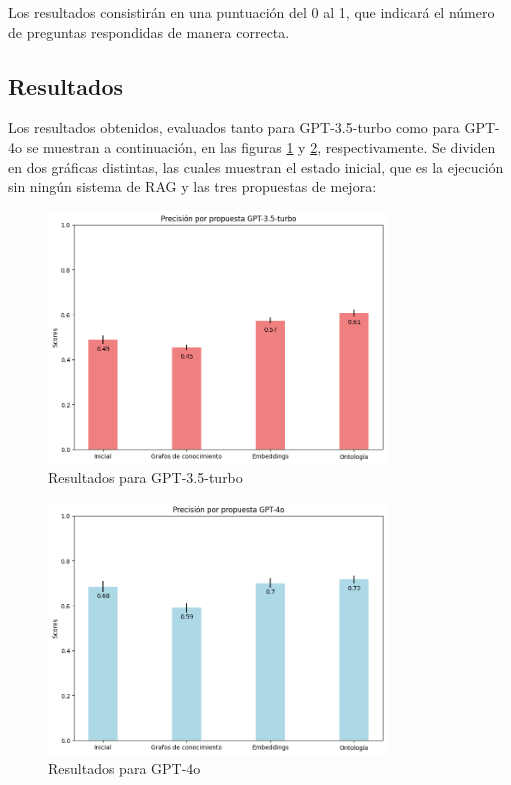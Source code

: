 Los resultados consistirán en una puntuación del 0 al 1, que indicará el número de preguntas respondidas de manera correcta.

\subsection{Resultados}
Los resultados obtenidos, evaluados tanto para GPT-3.5-turbo como para GPT-4o se muestran a continuación, en las figuras \ref{fig:resultados_gpt35} y \ref{fig:resultados_gpt4o}, respectivamente. Se dividen en dos gráficas distintas, las cuales muestran el estado inicial, que es la ejecución sin ningún sistema de RAG y las tres propuestas de mejora:

\begin{figure}[H]
    \centering
    \includegraphics[width=0.8\textwidth]{images/Resultados_gpt35.png}
    \caption{Resultados para GPT-3.5-turbo}
    \label{fig:resultados_gpt35}
\end{figure}

\begin{figure}[H]
    \centering
    \includegraphics[width=0.8\textwidth]{images/Resultados_gpt4o.png}
    \caption{Resultados para GPT-4o}
    \label{fig:resultados_gpt4o}
\end{figure}

